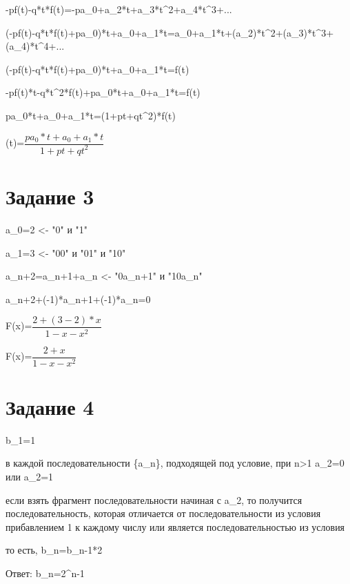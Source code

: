\documentclass[a4paper, 12pt]{article}
\newcommand{\ans}{Ответ: }
\begin{document}
		-pf(t)-q*t*f(t)=-pa_0+a_2*t+a_3*t^2+a_4*t^3+...

		(-pf(t)-q*t*f(t)+pa_0)*t+a_0+a_1*t=a_0+a_1*t+(a_2)*t^2+(a_3)*t^3+(a_4)*t^4+...

		(-pf(t)-q*t*f(t)+pa_0)*t+a_0+a_1*t=f(t)

		-pf(t)*t-q*t^2*f(t)+pa_0*t+a_0+a_1*t=f(t)

		pa_0*t+a_0+a_1*t=(1+pt+qt^2)*f(t)

		(t)=$\dfrac{pa_0*t+a_0+a_1*t}{1+pt+qt^2}$
	\section*{Задание 3}
		a_0=2 <- "0" и "1"

		a_1=3 <- "00" и "01" и "10"

		a_{n+2}=a_{n+1}+a_{n} <- "0a_{n+1}" и "10a_{n}"

		a_{n+2}+(-1)*a_{n+1}+(-1)*a_n=0

		F(x)=$\dfrac{2+(3-2)*x}{1-x-x^2}$

		F(x)=$\dfrac{2+x}{1-x-x^2}$
	\section*{Задание 4}
		b_1=1

		в каждой последовательности \{a_n\}, подходящей под условие, при n>1 a_2=0 или a_2=1

		если взять фрагмент последовательности начиная с a_2, то получится последовательность, которая отличается от последовательности из условия прибавлением 1 к каждому числу или является последовательностью из условия

		то есть, b_n=b_{n-1}*2

		\ans b_n=2^{n-1}
\end{document}
